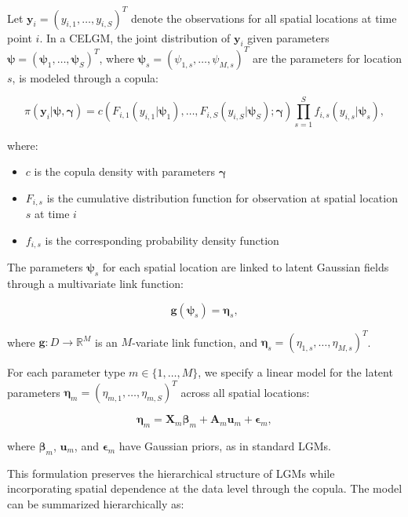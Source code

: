 Let $\mathbf{y}_i = (y_{i,1}, \ldots, y_{i,S})^T$ denote the observations for all spatial locations at time point $i$. In a CELGM, the joint distribution of $\mathbf{y}_i$ given parameters $\boldsymbol{\psi} = (\boldsymbol{\psi}_1, \ldots, \boldsymbol{\psi}_S)^T$, where $\boldsymbol{\psi}_s = (\psi_{1,s}, \ldots, \psi_{M,s})^T$ are the parameters for location $s$, is modeled through a copula:

\begin{equation}
    \pi(\mathbf{y}_i|\boldsymbol{\psi}, \boldsymbol{\gamma}) = c\left(F_{i,1}(y_{i,1}|\boldsymbol{\psi}_1), \ldots, F_{i,S}(y_{i,S}|\boldsymbol{\psi}_S); \boldsymbol{\gamma}\right) \prod_{s=1}^{S} f_{i,s}(y_{i,s}|\boldsymbol{\psi}_s),
\end{equation}

where:
\begin{itemize}
    \item $c$ is the copula density with parameters $\boldsymbol{\gamma}$
    \item $F_{i,s}$ is the cumulative distribution function for observation at spatial location $s$ at time $i$
    \item $f_{i,s}$ is the corresponding probability density function
\end{itemize}

The parameters $\boldsymbol{\psi}_s$ for each spatial location are linked to latent Gaussian fields through a multivariate link function:

\begin{equation}
    \mathbf{g}(\boldsymbol{\psi}_s) = \boldsymbol{\eta}_s,
\end{equation}

where $\mathbf{g}: D \rightarrow \mathbb{R}^M$ is an $M$-variate link function, and $\boldsymbol{\eta}_s = (\eta_{1,s}, \ldots, \eta_{M,s})^T$.

For each parameter type $m \in \{1, \ldots, M\}$, we specify a linear model for the latent parameters $\boldsymbol{\eta}_m = (\eta_{m,1}, \ldots, \eta_{m,S})^T$ across all spatial locations:

\begin{equation}
    \boldsymbol{\eta}_m = \mathbf{X}_m \boldsymbol{\beta}_m + \mathbf{A}_m \mathbf{u}_m + \boldsymbol{\epsilon}_m,
\end{equation}

where $\boldsymbol{\beta}_m$, $\mathbf{u}_m$, and $\boldsymbol{\epsilon}_m$ have Gaussian priors, as in standard LGMs.

This formulation preserves the hierarchical structure of LGMs while incorporating spatial dependence at the data level through the copula. The model can be summarized hierarchically as:


